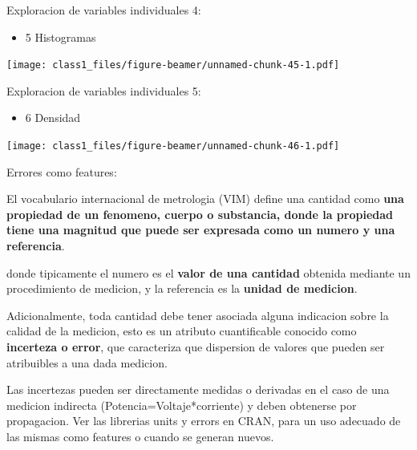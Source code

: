 \documentclass[ignorenonframetext,]{beamer}
\newenvironment{Shaded}{\begin{snugshade}}{\end{snugshade}}
\newcommand{\KeywordTok}[1]{\textcolor[rgb]{0.13,0.29,0.53}{\textbf{#1}}}
\newcommand{\OperatorTok}[1]{\textcolor[rgb]{0.81,0.36,0.00}{\textbf{#1}}}
\newcommand{\NormalTok}[1]{#1}
\providecommand{\tightlist}{%
  \setlength{\itemsep}{0pt}\setlength{\parskip}{0pt}}
\begin{document}
\begin{frame}[fragile]{Exploracion de variables individuales 4:}

\begin{itemize}
\tightlist
\item
  5 Histogramas
\end{itemize}

\begin{Shaded}
\end{Shaded}

\texttt{[image: class1\_files/figure-beamer/unnamed-chunk-45-1.pdf]}

\end{frame}

\begin{frame}[fragile]{Exploracion de variables individuales 5:}

\begin{itemize}
\tightlist
\item
  6 Densidad
\end{itemize}

\begin{Shaded}
\end{Shaded}

\texttt{[image: class1\_files/figure-beamer/unnamed-chunk-46-1.pdf]}

\end{frame}

\begin{frame}{Errores como features:}

El vocabulario internacional de metrologia (VIM) define una cantidad
como \textbf{una propiedad de un fenomeno, cuerpo o substancia, donde la
propiedad tiene una magnitud que puede ser expresada como un numero y
una referencia}.

donde tipicamente el numero es el \textbf{valor de una cantidad}
obtenida mediante un procedimiento de medicion, y la referencia es la
\textbf{unidad de medicion}.

Adicionalmente, toda cantidad debe tener asociada alguna indicacion
sobre la calidad de la medicion, esto es un atributo cuantificable
conocido como \textbf{incerteza o error}, que caracteriza que dispersion
de valores que pueden ser atribuibles a una dada medicion.

Las incertezas pueden ser directamente medidas o derivadas en el caso de
una medicion indirecta (Potencia=Voltaje*corriente) y deben obtenerse
por propagacion. Ver las librerias units y errors en CRAN, para un uso
adecuado de las mismas como features o cuando se generan nuevos.

\end{frame}
\end{document}
